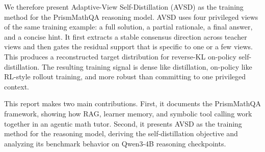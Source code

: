 We therefore present Adaptive-View Self-Distillation (AVSD) \citep{nguyen2026avsd} as the training method for the PrismMathQA reasoning model. AVSD uses four privileged views of the same training example: a full solution, a partial rationale, a final answer, and a concise hint. It first extracts a stable consensus direction across teacher views and then gates the residual support that is specific to one or a few views. This produces a reconstructed target distribution for reverse-KL on-policy self-distillation. The resulting training signal is dense like distillation, on-policy like RL-style rollout training, and more robust than committing to one privileged context.

This report makes two main contributions. First, it documents the PrismMathQA framework, showing how RAG, learner memory, and symbolic tool calling work together in an agentic math tutor. Second, it presents AVSD as the training method for the reasoning model, deriving the self-distillation objective and analyzing its benchmark behavior on Qwen3-4B reasoning checkpoints.
